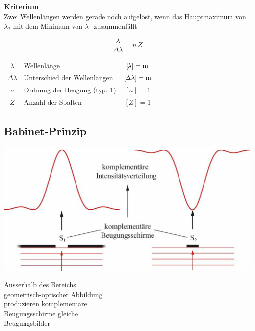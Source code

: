 \vspace{0.2cm}

\textbf{Kriterium}\\

Zwei Wellenlängen werden gerade
noch aufgelöst, wenn das
Hauptmaximum von $\lambda_2$ mit dem Minimum von $\lambda_1$ zusammenfällt

$$ \boxed{ \frac{\lambda}{\Delta \lambda} = n \, Z } $$


\renewcommand{\arraystretch}{1.3}
\begin{tabular}{clc}
$\lambda$ & Wellenlänge & $[\lambda] = \mathrm{m}$ \\
$\Delta \lambda$ & Unterschied der Wellenlängen & $[ \Delta \lambda] = \mathrm{m}$ \\
$n$ & Ordnung der Beugung (typ. 1) & $[n] = 1$ \\
$Z$ & Anzahl der Spalten & $[Z] = 1$ 
\end{tabular}
\renewcommand{\arraystretch}{1}




\subsection{Babinet-Prinzip}

\begin{minipage}{0.48\linewidth}
\includegraphics[width=0.98\linewidth]{Bilder/Wellen-Optik/babinet_prinzip} \\
\end{minipage}
\hfill
\begin{minipage}{0.48\linewidth}

Ausserhalb des Bereichs \\
geometrisch-optischer Abbildung\\
produzieren komplementäre\\
Beugungsschirme gleiche \\
Beugungsbilder
\end{minipage}





